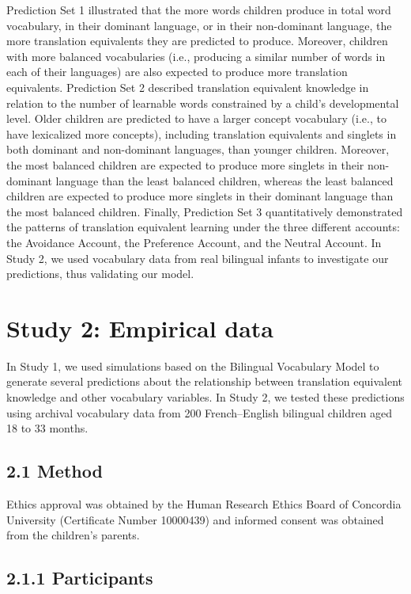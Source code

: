 \documentclass[
  english,
  ,man,floatsintext]{apa6}
\begin{document}
Prediction Set 1 illustrated that the more words children produce in total word vocabulary, in their dominant language, or in their non-dominant language, the more translation equivalents they are predicted to produce. Moreover, children with more balanced vocabularies (i.e., producing a similar number of words in each of their languages) are also expected to produce more translation equivalents. Prediction Set 2 described translation equivalent knowledge in relation to the number of learnable words constrained by a child's developmental level. Older children are predicted to have a larger concept vocabulary (i.e., to have lexicalized more concepts), including translation equivalents and singlets in both dominant and non-dominant languages, than younger children. Moreover, the most balanced children are expected to produce more singlets in their non-dominant language than the least balanced children, whereas the least balanced children are expected to produce more singlets in their dominant language than the most balanced children. Finally, Prediction Set 3 quantitatively demonstrated the patterns of translation equivalent learning under the three different accounts: the Avoidance Account, the Preference Account, and the Neutral Account. In Study 2, we used vocabulary data from real bilingual infants to investigate our predictions, thus validating our model.

\hypertarget{study-2-empirical-data}{%
\section{Study 2: Empirical data}\label{study-2-empirical-data}}

In Study 1, we used simulations based on the Bilingual Vocabulary Model to generate several predictions about the relationship between translation equivalent knowledge and other vocabulary variables. In Study 2, we tested these predictions using archival vocabulary data from 200 French--English bilingual children aged 18 to 33 months.

\hypertarget{method}{%
\subsection{2.1 Method}\label{method}}

Ethics approval was obtained by the Human Research Ethics Board of Concordia University (Certificate Number 10000439) and informed consent was obtained from the children's parents.

\hypertarget{participants}{%
\subsection{2.1.1 Participants}\label{participants}}
\end{document}
